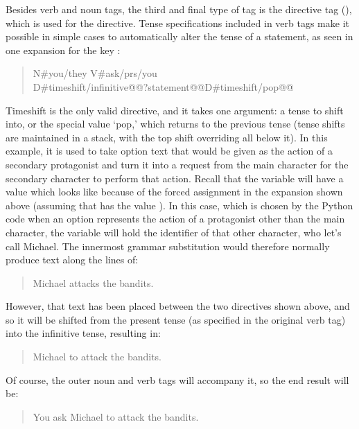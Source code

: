 Besides verb and noun tags, the third and final type of tag is the directive tag (), which is used for the  directive.
%
Tense specifications included in verb tags make it possible in simple cases to automatically alter the tense of a statement, as seen in one expansion for the key :

\begin{quote}
\ttfamily
N\#you/they V\#ask/prs/you \\
\ind D\#timeshift/infinitive@@?statement@@D\#timeshift/pop@@
\end{quote}

Timeshift is the only valid directive, and it takes one argument: a tense to shift into, or the special value `pop,' which returns to the previous tense (tense shifts are maintained in a stack, with the top shift overriding all below it).
%
In this example, it is used to take option text that would be given as the action of a secondary protagonist and turn it into a request from the main character for the secondary character to perform that action.
%
Recall that the  variable will have a value which looks like  because of the forced assignment in the  expansion shown above (assuming that  has the value ).
%
In this case, which is chosen by the Python code when an option represents the action of a protagonist other than the main character, the  variable will hold the identifier of that other character, who let's call Michael.
%
The innermost grammar substitution would therefore normally produce text along the lines of:

\begin{quote}
  Michael attacks the bandits.
\end{quote}

However, that text has been placed between the two  directives shown above, and so it will be shifted from the present tense (as specified in the original verb tag) into the infinitive tense, resulting in:

\begin{quote}
  Michael to attack the bandits.
\end{quote}

Of course, the outer noun and verb tags will accompany it, so the end result will be:

\begin{quote}
  You ask Michael to attack the bandits.
\end{quote}

